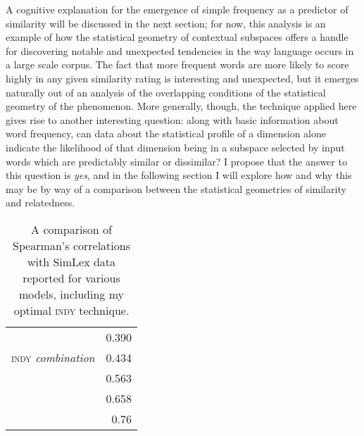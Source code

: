A cognitive explanation for the emergence of simple frequency as a predictor of similarity will be discussed in the next section; for now, this analysis is an example of how the statistical geometry of contextual subspaces offers a handle for discovering notable and unexpected tendencies in the way language occurs in a large scale corpus.  The fact that more frequent words are more likely to score highly in any given similarity rating is interesting and unexpected, but it emerges naturally out of an analysis of the overlapping conditions of the statistical geometry of the phenomenon.  More generally, though, the technique applied here gives rise to another interesting question: along with basic information about word frequency, can data about the statistical profile of a dimension alone indicate the likelihood of that dimension being in a subspace selected by input words which are predictably similar or dissimilar?  I propose that the answer to this question is \emph{yes}, and in the following section I will explore how and why this may be by way of a comparison between the statistical geometries of similarity and relatedness.

\begin{table}
\centering
\begin{tabular}{lr}
\hline
\cite{MaEA2017} & 0.390 \\
\textsc{indy} \emph{combination} & 0.434 \\
\cite{SchwartzEA2015} & 0.563 \\
\cite{BanjadeEA2015} & 0.658 \\
\cite{RecskiEA2016} & 0.76 \\
\hline
\end{tabular}
\caption[Comparison of Similarity Scores]{A comparison of Spearman's correlations with SimLex data reported for various models, including my optimal \textsc{indy} technique.}
\label{tab:simpare}
\end{table}

